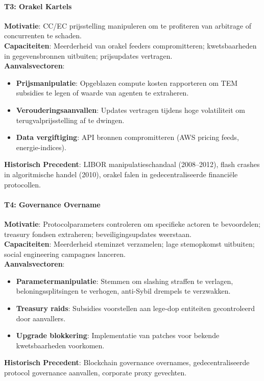\documentclass[11pt]{article}
\begin{document}
\paragraph{T3: Orakel Kartels}
\textbf{Motivatie}: CC/EC prijsstelling manipuleren om te profiteren van arbitrage of concurrenten te schaden.\\
\textbf{Capaciteiten}: Meerderheid van orakel feeders compromitteren; kwetsbaarheden in gegevensbronnen uitbuiten; prijsupdates vertragen.\\
\textbf{Aanvalsvectoren}:
\begin{itemize}[noitemsep]
  \item \textbf{Prijsmanipulatie}: Opgeblazen compute kosten rapporteren om TEM subsidies te legen of waarde van agenten te extraheren.
  \item \textbf{Verouderingsaanvallen}: Updates vertragen tijdens hoge volatiliteit om terugvalprijsstelling af te dwingen.
  \item \textbf{Data vergiftiging}: API bronnen compromitteren (AWS pricing feeds, energie-indices).
\end{itemize}
\textbf{Historisch Precedent}: LIBOR manipulatieschandaal (2008--2012), flash crashes in algoritmische handel (2010), orakel falen in gedecentraliseerde financiële protocollen.

\paragraph{T4: Governance Overname}
\textbf{Motivatie}: Protocolparameters controleren om specifieke actoren te bevoordelen; treasury fondsen extraheren; beveiligingsupdates weerstaan.\\
\textbf{Capaciteiten}: Meerderheid steminzet verzamelen; lage stemopkomst uitbuiten; social engineering campagnes lanceren.\\
\textbf{Aanvalsvectoren}:
\begin{itemize}[noitemsep]
  \item \textbf{Parametermanipulatie}: Stemmen om slashing straffen te verlagen, beloningssplitsingen te verhogen, anti-Sybil drempels te verzwakken.
  \item \textbf{Treasury raids}: Subsidies voorstellen aan lege-dop entiteiten gecontroleerd door aanvallers.
  \item \textbf{Upgrade blokkering}: Implementatie van patches voor bekende kwetsbaarheden voorkomen.
\end{itemize}
\textbf{Historisch Precedent}: Blockchain governance overnames, gedecentraliseerde protocol governance aanvallen, corporate proxy gevechten.
\end{document}
